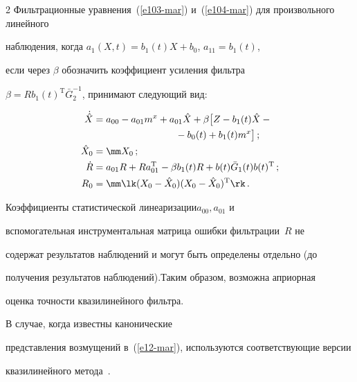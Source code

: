 \begin{multicols}{2}
Фильтрационные уравнения~(\ref{e103-mar}) и~(\ref{e104-mar}) для произвольного линейного


наблюдения, когда  $a_1(X,t) = b_1 (t) X + b_0$, $ a_{11} = b_1 (t)$, 


если через  $\beta$ обозначить коэффициент усиления фильтра


$\beta = R b_1 (t)^{\mathrm{T}} \bar G_2^{-1}$, принимают следующий вид:


\begin{align*}


{\dot{\hat X}} &= a_{00} - a_{01} m^x + a_{01} \hat X + \beta \bigl[ Z- b_1(t) \hat X -{}\\


&\hspace*{30mm}{}-b_0(t) + b_1(t) m^x\bigr]\,;\\


\hat X_0 &=\mm X_0\,;\\ %


\dot R &= a_{01} R + R a_{01}^{\mathrm{T}} - \beta b_1(t) R + b(t) \bar G_1 (t) b(t)^{\mathrm{T}}\,;\\


R_0 &=\mm \lk (X_0 -\hat X_0)(X_0 -\hat X_0)^{\mathrm{T}}\rk\,. %


\end{align*}





Коэффициенты статистической линеаризации\linebreak  $a_{00}, a_{01}$ и


вспомогательная инструментальная мат\-ри\-ца ошибки фильт\-ра\-ции~$R$ не


содержат ре\-зуль\-татов наблюдений и могут быть определены от\-дельно (до


получения результатов наблюдений).\linebreak Таким образом, возможна априорная


оценка точности квазилинейного \mbox{фильтра}.





 В случае, когда известны канонические


 пред\-став\-ле\-ния возмущений  в~(\ref{e12-mar}), используются соответствующие версии


 квазилинейного метода~\cite{17-mar, 19-mar, 20-mar}.






\end{multicols}
